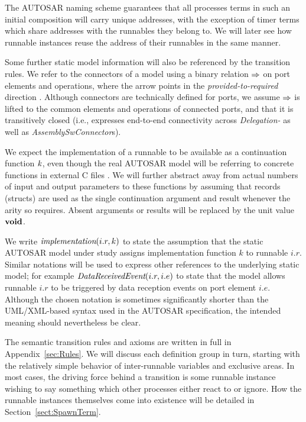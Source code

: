 \documentclass[10pt,conference]{IEEEtran}
\begin{document}
The AUTOSAR naming scheme \cite[ch.~3.2.5]{AR:SWC} guarantees that all processes terms in such an initial composition will carry unique addresses, with the exception of timer terms which share addresses with the runnables they belong to. We will later see how runnable instances reuse the address of their runnables in the same manner.

Some further static model information will also be referenced by the transition rules. We refer to the connectors of a model using a binary relation $ \Rightarrow $ on port elements and operations, where the arrow points in the \emph{provided-to-required} direction \cite[ch.~3.3.3]{AR:SWC}. Although connectors are technically defined for ports, we assume $ \Rightarrow $ is lifted to the common elements and operations of connected ports, and that it is transitively closed (i.e., expresses end-to-end connectivity across \emph{Delegation-} as well as \emph{AssemblySwConnector}s).

We expect the implementation of a runnable to be available as a continuation function $\Cont$, even though the real AUTOSAR model will be referring to concrete functions in external C files \cite[ch.~5.1.1]{AR:RTE}. We will further abstract away from actual numbers of input and output parameters to these functions by assuming that records (structs) are used as the single continuation argument and result whenever the arity so requires. Absent arguments or results will be replaced by the unit value $\textbf{void}$.

We write $\emph{implementation}(i.r,k)$ to state the assumption that the static AUTOSAR model under study assigns implementation function $k$ to runnable $i.r$. Similar notations will be used to express other references to the underlying static model; for example $\emph{DataReceivedEvent}(i.r,i.e)$ to state that the model allows runnable $i.r$ to be triggered by data reception events on port element $i.e$. Although the chosen notation is sometimes significantly shorter than the UML/XML-based syntax used in the AUTOSAR specification, the intended meaning should nevertheless be clear.

The semantic transition rules and axioms  are written in full in Appendix~\ref{sec:Rules}. We will discuss each definition group in turn, starting with the relatively simple behavior of inter-runnable variables and exclusive areas. In most cases, the driving force behind a transition is some runnable instance wishing to say something which other processes either react to or ignore. How the runnable instances themselves come into existence will be detailed in Section~\ref{sect:SpawnTerm}.
\end{document}
